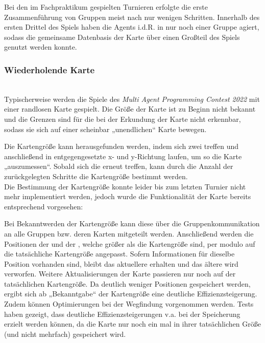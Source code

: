 Bei den im Fachpraktikum gespielten Turnieren erfolgte die erste Zusammenführung von Gruppen meist nach nur wenigen Schritten. Innerhalb des ersten Drittel des Spiels haben die Agents i.d.R. in nur noch einer Gruppe agiert, sodass die gemeinsame Datenbasis der Karte über einen Großteil des Spiels genutzt werden konnte. 

\subsubsection{Wiederholende Karte} ~\\
Typischerweise werden die Spiele des \textit{Multi Agent Programming Contest 2022} mit einer randlosen Karte gespielt. Die Größe der Karte ist zu Beginn nicht bekannt und die Grenzen sind für die \Agents bei der Erkundung der Karte nicht erkennbar, sodass sie sich auf einer scheinbar „unendlichen“ Karte bewegen.\newline

Die Kartengröße kann herausgefunden werden, indem sich zwei \Agents treffen und anschließend in entgegengesetzte x- und y-Richtung laufen, um so die Karte „auszumessen“. Sobald sich die \Agents erneut treffen, kann durch die Anzahl der zurückgelegten Schritte die Kartengröße bestimmt werden. \\ Die Bestimmung der Kartengröße konnte leider bis zum letzten Turnier nicht mehr implementiert werden, jedoch wurde die Funktionalität der Karte bereits entsprechend vorgesehen: \newline

Bei Bekanntwerden der Kartengröße kann diese über die Gruppenkommunikation an alle Gruppen bzw. deren Karten mitgeteilt werden. Anschließend werden die Positionen der \NextMapTiles und der \Agents, welche größer als die Kartengröße sind, per modulo auf die tatsächliche Kartengröße angepasst. Sofern Informationen für dieselbe Position vorhanden sind, bleibt das aktuellere \NextMapTile erhalten und das ältere wird verworfen. Weitere Aktualisierungen der Karte passieren nur noch auf der tatsächlichen Kartengröße. Da deutlich weniger Positionen gespeichert werden, ergibt sich ab „Bekanntgabe“ der Kartengröße eine deutliche Effizienzsteigerung. Zudem können Optimierungen bei der Wegfindung vorgenommen werden. Tests haben gezeigt, dass deutliche Effizienzsteigerungen v.a. bei der Speicherung erzielt werden können, da die Karte nur noch ein mal in ihrer tatsächlichen Größe (und nicht mehrfach) gespeichert wird.  

